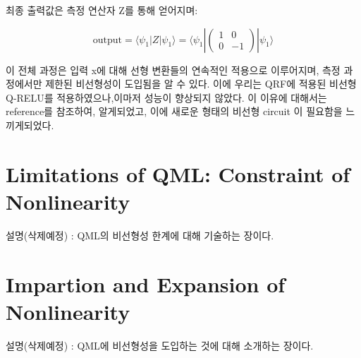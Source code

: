 최종 출력값은 측정 연산자 Z를 통해 얻어지며:

\[
\text{output} = \langle\psi_1|Z|\psi_1\rangle = \langle\psi_1|\begin{pmatrix} 1 & 0 \\ 0 & -1 \end{pmatrix}|\psi_1\rangle
\]

이 전체 과정은 입력 x에 대해 선형 변환들의 연속적인 적용으로 이루어지며, 측정 과정에서만 제한된 비선형성이 도입됨을 알 수 있다. 이에 우리는 QRF에 적용된 비선형 Q-RELU를 적용하였으나,이마저 성능이 향상되지 않았다. 이 이유에 대해서는 reference를 참조하여,
알게되었고, 이에 새로운 형태의 비선형 circuit 이 필요함을 느끼게되었다.






\section{Limitations of QML: Constraint of Nonlinearity}
설명(삭제예정) : QML의 비선형성 한계에 대해 기술하는 장이다.


\section{Impartion and Expansion of Nonlinearity}
설명(삭제예정) : QML에 비선형성을 도입하는 것에 대해 소개하는 장이다.

